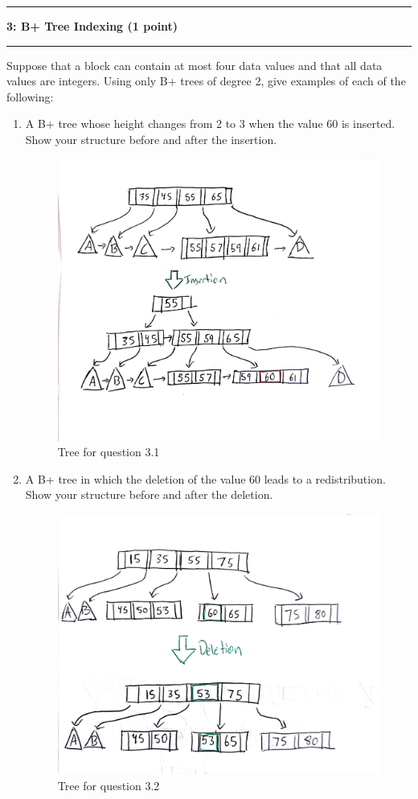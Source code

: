 \documentclass[11pt]{article}
\newcommand\question[2]{\vspace{.25in}\hrule\textbf{#1: #2}\vspace{.5em}\hrule\vspace{.10in}}
\begin{document}
\question{3}{B+ Tree Indexing (1 point)}
Suppose that a block can contain at most four data values and that all data values are integers. Using only B+ trees of degree 2, give examples of each of the following:
\begin{enumerate}
	\item A B+ tree whose height changes from 2 to 3 when the value 60 is inserted. Show your structure before and after the insertion.\\

	\begin{figure}[H]
		\centering
		\includegraphics[width=0.9\columnwidth]{figure_q3_1.png}
		\caption{Tree for question 3.1}
		\label{figure:q3.1}
	\end{figure}

	\item A B+ tree in which the deletion of the value 60 leads to a redistribution. Show your structure before and after the deletion.\\

	\begin{figure}[H]
		\centering
		\includegraphics[width=0.9\columnwidth]{figure_q3_2.png}
		\caption{Tree for question 3.2}
		\label{figure:q3.2}
	\end{figure}


\end{enumerate}
\end{document}
